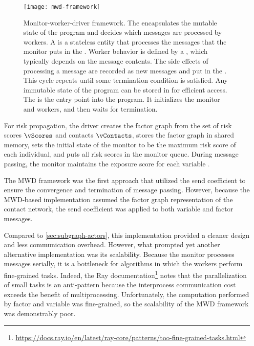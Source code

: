 \begin{figure}[htbp]
\centering
\texttt{[image: mwd-framework]}
\caption[Monitor-worker-driver framework]{Monitor-worker-driver framework. The  encapsulates the mutable state of the program and decides which messages are processed by workers. A  is a stateless entity that processes the messages that the monitor puts in the . Worker behavior is defined by a , which typically depends on the message contents. The side effects of processing a message are recorded as new messages and put in the . This cycle repeats until some termination condition is satisfied. Any immutable state of the program can be stored in  for efficient access. The  is the entry point into the program. It initializes the monitor and workers, and then waits for termination.}
\label{fig:mwd-framework}
\end{figure}

For risk propagation, the driver creates the factor graph from the set of risk scores $\vScores$ and contacts $\vContacts$, stores the factor graph in shared memory, sets the initial state of the monitor to be the maximum risk score of each individual, and puts all risk scores in the monitor queue. During message passing, the monitor maintains the exposure score for each variable \vertexName.

The MWD framework was the first approach that utilized the send coefficient to ensure the convergence and termination of message passing. However, because the MWD-based implementation assumed the factor graph representation of the contact network, the send coefficient was applied to both variable and factor messages.

Compared to \cref{sec:subgraph-actors}, this implementation provided a cleaner design and less communication overhead. However, what prompted yet another alternative implementation was its scalability. Because the monitor processes messages serially, it is a bottleneck for algorithms in which the workers perform fine-grained tasks. Indeed, the Ray documentation\footnote{\url{https://docs.ray.io/en/latest/ray-core/patterns/too-fine-grained-tasks.html}} notes that the parallelization of small tasks is an anti-pattern because the interprocess communication cost exceeds the benefit of multiprocessing. Unfortunately, the computation performed by factor \verticesName and variable \verticesName was fine-grained, so the scalability of the MWD framework was demonstrably poor.

